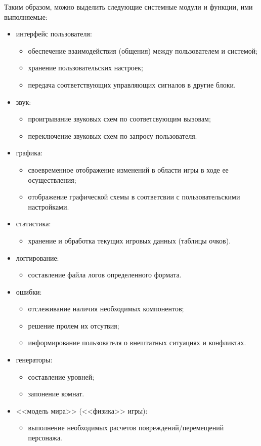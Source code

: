 \documentclass[12pt,a4paper,fullpage,titlepage]{article}
\begin{document}
Таким образом, можно выделить следующие системные модули и функции, ими выполняемые:
\begin{itemize}
	\item интерфейс пользователя:
	\begin{itemize}
		\item обеспечение взаимодействия (общения) между пользователем и системой;
		\item хранение пользовательских настроек;
		\item передача соответствующих управляющих сигналов в другие блоки.
	\end{itemize}
	\item звук:
	\begin{itemize}
		\item проигрывание звуковых схем по соответсвующим вызовам;
		\item переключение звуковых схем по запросу пользователя.
	\end{itemize}
	\item графика:
	\begin{itemize}
		\item своевременное отображение изменений в области игры в ходе ее осуществления;
		\item отображение графической схемы в соответсвии с пользовательскими настройками.
	\end{itemize}
	\item статистика:
	\begin{itemize}
		\item хранение и обработка текущих игровых данных (таблицы очков).
	\end{itemize}
	\item логгирование:
	\begin{itemize}
		\item составление файла логов определенного формата.\\
	\end{itemize}	
	\item ошибки:
	\begin{itemize}
		\item отслеживание наличия необходимых компонентов;
		\item решение пролем их отсутвия;
		\item информирование пользователя о внештатных ситуациях и конфликтах.
	\end{itemize}
	\item генераторы:	
	\begin{itemize}
		\item составление уровней;
		\item запонение комнат.
	\end{itemize}
	\item <<модель мира>> (<<физика>> игры):
	\begin{itemize}
		\item выполнение необходимых расчетов повреждений/перемещений персонажа.
	\end{itemize}
\end{itemize}
\end{document}
